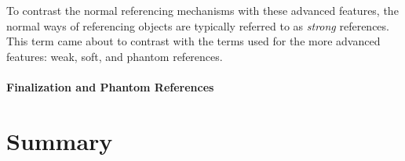 To contrast the normal referencing mechanisms with these advanced features, the
normal ways of referencing objects are typically referred to as \emph{strong}
references. This term came about to contrast with the terms used for the more
advanced features: weak, soft, and phantom references.

\paragraph{Finalization and Phantom References}


\paragraph{\TLS}
\tlsindex %

\section{Summary}


